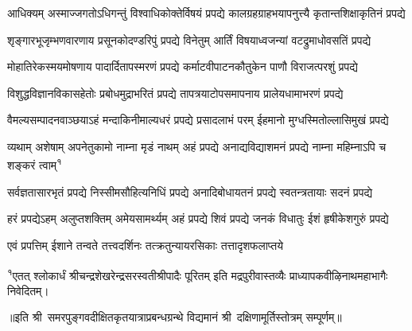 

\twolineshloka
{आधिक्यम् अस्माज्जगतोऽधिगन्तुं विश्वाधिकोक्तेर्विषयं प्रपद्ये}
{कालग्रहग्राहभयापनुत्त्यै कृतान्तशिक्षाकृतिनं प्रपद्ये}

\twolineshloka
{शृङ्गारभूजृम्भणवारणाय प्रसूनकोदण्डरिपुं प्रपद्ये}
{विनेतुम् आर्तिं विषयाध्वजन्यां वटद्रुमाधोवसतिं प्रपद्ये}

\twolineshloka
{मोहातिरेकस्मयमोषणाय पादार्दितापस्मरणं प्रपद्ये}
{कर्माटवीपाटनकौतुकेन पाणौ विराजत्परशुं प्रपद्ये}

\twolineshloka
{विशुद्धविज्ञानविकासहेतोः प्रबोधमुद्राभरितं प्रपद्ये}
{तापत्रयाटोपसमापनाय प्रालेयधामाभरणं प्रपद्ये}

\twolineshloka
{वैमल्यसम्पादनवाञ्छयाऽहं मन्दाकिनीमाल्यधरं प्रपद्ये}
{प्रसादलाभं परम् ईहमानो मुग्धस्मितोल्लासिमुखं प्रपद्ये}

\twolineshloka
{व्यथाम् अशेषाम् अपनेतुकामो नाम्ना मृडं नाथम् अहं प्रपद्ये}
{अनाद्यविद्याशमनं प्रपद्ये नाम्ना महिम्नाऽपि च शङ्करं त्वाम्\textsuperscript{१}}

\twolineshloka
{सर्वज्ञतासारभृतं प्रपद्ये निस्सीमसौहित्यनिधिं प्रपद्ये}
{अनादिबोधायतनं प्रपद्ये स्वतन्त्रतायाः सदनं प्रपद्ये}

\twolineshloka
{हरं प्रपद्येऽहम् अलुप्तशक्तिम् अमेयसामर्थ्यम् अहं प्रपद्ये}
{शिवं प्रपद्ये जनकं विधातुः ईशं हृषीकेशगुरुं प्रपद्ये}

\twolineshloka
{एवं प्रपत्तिम् ईशाने तन्वते तत्त्वदर्शिनः}
{तत्क्रतुन्यायरसिकाः तत्तादृशफलाप्तये}

{\raggedright\fontsize{8}{9}\selectfont \textsuperscript{१}{एतत् श्लोकार्धं श्रीचन्द्रशेखरेन्द्रसरस्वतीश्रीपादैः पूरितम् इति मद्रपुरीवास्तव्यैः प्राध्यापकवीऴिनाथमहाभागैः निवेदितम्।}}


॥इति श्री~समरपुङ्गवदीक्षितकृतयात्राप्रबन्धग्रन्थे विद्यमानं श्री~दक्षिणामूर्तिस्तोत्रम् सम्पूर्णम्॥
